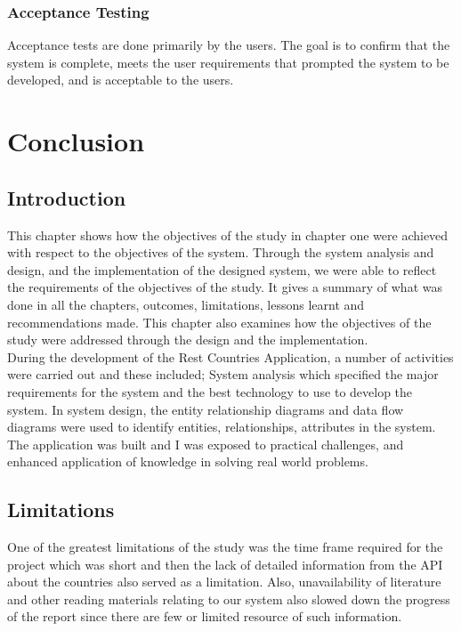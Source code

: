 \documentclass[twoside, a4paper, 12pt]{report}
\begin{document}
\subsection{Acceptance Testing}
Acceptance tests are done primarily by the users. The goal is to confirm that the system is complete, meets the user requirements that prompted the system to be developed, and is acceptable to the users.

\chapter{Conclusion}
\section{Introduction}
This chapter shows how the objectives of the study in chapter one were achieved with respect to the objectives of the system.
Through the system analysis and design, and the implementation of the designed system, we were able to reflect the requirements of the objectives of the study.
It gives a summary of what was done in all the chapters, outcomes, limitations, lessons learnt and recommendations made.
This chapter also examines how the objectives of the study were addressed through the design and the implementation.\\
\indent
During the development of the Rest Countries Application, a number of activities were carried out and these included;
System analysis which specified the major requirements for the system and the best technology to use to develop the system.
In system design, the entity relationship diagrams and data flow diagrams were used to identify entities, relationships, attributes in the system.\\
\indent
The application was built and I was exposed to practical challenges, and enhanced application of knowledge in solving real world problems.

\section{Limitations}
One of the greatest limitations of the study was the time frame required for the project which was short and then the lack of detailed information from the API about the countries also served as a limitation. Also, unavailability of literature and other reading materials relating to our system also slowed down the progress of the report since there are few or limited resource of such information.
\end{document}
